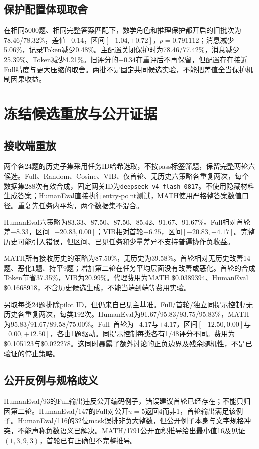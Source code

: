 \documentclass[11pt,a4paper]{article}
\begin{document}
\subsection{保护配置体现取舍}
在相同5000题、相同完整答案匹配下，数学角色和推理保护都开启的旧批次为78.46/78.32\%，差值$-0.14$，区间$[-1.04,+0.72]$，$p=0.791112$；消息减少5.06\%，记录Token减少0.48\%。主配置关闭保护时为78.46/77.42\%，消息减少25.39\%、Token减少4.21\%。旧评分的$+0.34$在重评后不再保留，但配置存在接近Full精度与更大压缩的取舍。两批不是固定共同候选实验，不能把差值全当保护机制因果收益。

\section{冻结候选重放与公开证据}
\subsection{接收端重放}
两个各24题的历史子集采用任务ID哈希选取，不按pass标签筛题，保留完整两轮六候选。Full、Random、Cosine、VIB、仅首轮、无历史六策略各重复两次，每个数据集288次有效合成，固定网关ID为\texttt{deepseek-v4-flash-0817}。不使用隐藏材料生成答案；HumanEval直接执行entry-point测试，MATH使用严格整答案数值口径。重复先任务内平均，两个数据集不混合。

HumanEval六策略为83.33、87.50、87.50、85.42、91.67、91.67\%。Full相对首轮差$-8.33$，区间$[-20.83,0.00]$；VIB相对首轮$-6.25$，区间$[-20.83,+4.17]$。完整历史可能引入错误，但区间、已见任务和少量差异不支持普遍协作负收益。

MATH所有接收历史的策略为87.50\%，无历史为39.58\%。首轮相对无历史改善14题、恶化1题、持平9题；增加第二轮在任务平均层面没有改善或恶化。首轮的合成Token节省37.35\%，VIB为20.99\%。代理费用为MATH \$0.0389394、HumanEval \$0.1668918，不含历史候选生成，不能当端到端等费用实验。

另取每类24题排除pilot ID，但仍来自已见主基准。Full/首轮/独立同提示控制/无历史各重复两次，每类192次。HumanEval为91.67/95.83/93.75/95.83\%，MATH为95.83/91.67/89.58/75.00\%。Full--首轮为$-4.17$与$+4.17$，区间$[-12.50,0.00]$与$[0.00,+12.50]$，各由1题驱动。同提示控制每类各有1/48评分不同。费用为\$0.105123与\$0.022278。这同时暴露了额外讨论的正负边界及残余随机性，不是已验证的停止策略。

\subsection{公开反例与规格歧义}
HumanEval/93的Full输出违反公开编码例子，错误建议首轮已经存在；不能只归因第二轮。HumanEval/147的Full对公开$n=5$返回4而非1，首轮输出满足该例子。HumanEval/116的32位mask误排非负大整数，但公开例子本身与文字规格冲突，不能声称负数语义已解决。MATH/1791公开面积推导给出最小值16及见证$(1,3,9,3)$，首轮已有正确但不完整推导。
\end{document}
